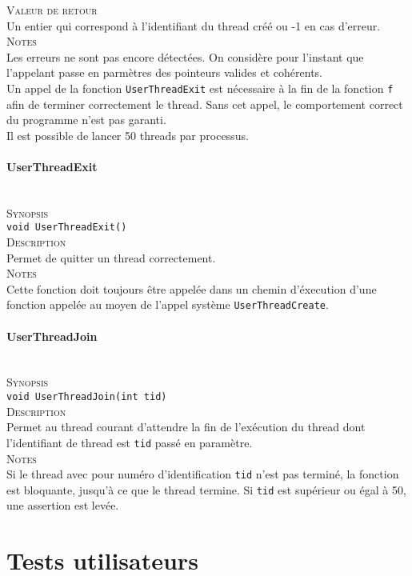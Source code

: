 \documentclass{report}
\newcommand{\myparagraph}[1]{\paragraph*{#1}\mbox{}\\}
\begin{document}
\textsc{Valeur de retour}\\
	Un entier qui correspond à l'identifiant du thread créé ou -1 en cas d'erreur.\\
	
\textsc{Notes}\\
	Les erreurs ne sont pas encore détectées. On considère pour l'instant que l'appelant passe en parmètres des pointeurs valides et cohérents.\\
	Un appel de la fonction \texttt{UserThreadExit} est nécessaire à la fin de la fonction \texttt{f} afin de terminer correctement le thread. Sans cet appel, le comportement correct du programme n'est pas garanti.\\
	Il est possible de lancer 50 threads par processus.
	
	
	
	
	
\myparagraph{UserThreadExit}

\textsc{Synopsis}\\
	\texttt{void UserThreadExit()}\\
	
\textsc{Description}\\
	Permet de quitter un thread correctement.\\
	
\textsc{Notes}\\
	Cette fonction doit toujours être appelée dans un chemin d'éxecution d'une fonction appelée au moyen de l'appel système \texttt{UserThreadCreate}.
	
	
	
	
	
\myparagraph{UserThreadJoin}

\textsc{Synopsis}\\
	\texttt{void UserThreadJoin(int tid)}\\
	
\textsc{Description}\\
	Permet au thread courant d'attendre la fin de l'exécution du thread dont l'identifiant de thread est \texttt{tid} passé en paramètre.\\
	
\textsc{Notes}\\
	Si le thread avec pour numéro d'identification \texttt{tid} n'est pas terminé, la fonction est bloquante, jusqu'à ce que le thread termine. Si \texttt{tid} est supérieur ou égal à 50, une assertion est levée.

\section*{Tests utilisateurs}
\end{document}
